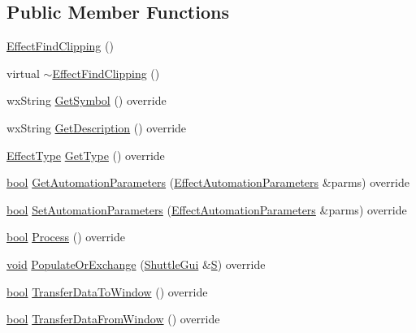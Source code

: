 \subsection*{Public Member Functions}
\begin{DoxyCompactItemize}
\item 
\hyperlink{class_effect_find_clipping_ac0e46904ecb187f3376eb60a880ab2e2}{Effect\+Find\+Clipping} ()
\item 
virtual \hyperlink{class_effect_find_clipping_abaa7ffb7bb923387f3762f3375989ee4}{$\sim$\+Effect\+Find\+Clipping} ()
\item 
wx\+String \hyperlink{class_effect_find_clipping_a7977c0ea76cf02535d5aa17b9fed6b08}{Get\+Symbol} () override
\item 
wx\+String \hyperlink{class_effect_find_clipping_aace20f236ba973ceb0d25d36e4ebab0b}{Get\+Description} () override
\item 
\hyperlink{_effect_interface_8h_a4809a7bb3fd1a421902a667cc1405d43}{Effect\+Type} \hyperlink{class_effect_find_clipping_a037ceb55992fde90930899b10851e114}{Get\+Type} () override
\item 
\hyperlink{mac_2config_2i386_2lib-src_2libsoxr_2soxr-config_8h_abb452686968e48b67397da5f97445f5b}{bool} \hyperlink{class_effect_find_clipping_a20fbbd381ddecc18b12737bb3f4ca03f}{Get\+Automation\+Parameters} (\hyperlink{class_effect_automation_parameters}{Effect\+Automation\+Parameters} \&parms) override
\item 
\hyperlink{mac_2config_2i386_2lib-src_2libsoxr_2soxr-config_8h_abb452686968e48b67397da5f97445f5b}{bool} \hyperlink{class_effect_find_clipping_a15d03a6d55e870c39508f1ac3148622a}{Set\+Automation\+Parameters} (\hyperlink{class_effect_automation_parameters}{Effect\+Automation\+Parameters} \&parms) override
\item 
\hyperlink{mac_2config_2i386_2lib-src_2libsoxr_2soxr-config_8h_abb452686968e48b67397da5f97445f5b}{bool} \hyperlink{class_effect_find_clipping_a4e1cf76df0bbf9ca7494bc6210cb0a6f}{Process} () override
\item 
\hyperlink{sound_8c_ae35f5844602719cf66324f4de2a658b3}{void} \hyperlink{class_effect_find_clipping_a1508aa743ffd06353841e8e475cbece3}{Populate\+Or\+Exchange} (\hyperlink{class_shuttle_gui}{Shuttle\+Gui} \&\hyperlink{xlftab_8c_af933676109efed7ab34cea71d748a517}{S}) override
\item 
\hyperlink{mac_2config_2i386_2lib-src_2libsoxr_2soxr-config_8h_abb452686968e48b67397da5f97445f5b}{bool} \hyperlink{class_effect_find_clipping_ab5b3db0da022497cc1f5aac907a8bdbe}{Transfer\+Data\+To\+Window} () override
\item 
\hyperlink{mac_2config_2i386_2lib-src_2libsoxr_2soxr-config_8h_abb452686968e48b67397da5f97445f5b}{bool} \hyperlink{class_effect_find_clipping_ac468a2862066b34cb9f954a901b9c19f}{Transfer\+Data\+From\+Window} () override
\end{DoxyCompactItemize}
